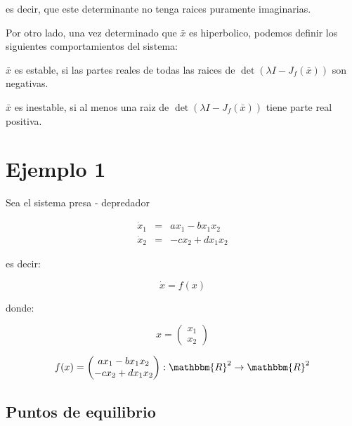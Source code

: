        es decir, que este determinante no tenga raices puramente imaginarias.

        Por otro lado, una vez determinado que $\bar{x}$ es hiperbolico, podemos definir los siguientes comportamientos del sistema:

        $\bar{x}$ es estable, si las partes reales de todas las raices de $\det{(\lambda I - J_f(\bar{x}))}$ son negativas.

        $\bar{x}$ es inestable, si al menos una raiz de $\det{(\lambda I - J_f(\bar{x}))}$ tiene parte real positiva.

    \section{Ejemplo 1}

        Sea el sistema presa - depredador

        \begin{eqnarray*}
            \dot{x}_1 & = & a x_1 - b x_1 x_2 \\
            \dot{x}_2 & = & -c x_2 + d x_1 x_2
        \end{eqnarray*}

        es decir:

        \begin{equation*}
            \dot{x} = f(x)
        \end{equation*}

        donde:

        \begin{equation}
            x =
            \begin{pmatrix}
                x_1 \\
                x_2
            \end{pmatrix}
        \end{equation}

        \begin{equation} \label{eq:predep}
            f(x) =
            \begin{pmatrix}
                a x_1 - b x_1 x_2 \\
                -c x_2 + d x_1 x_2
            \end{pmatrix} : \mathbbm{R}^2 \to \mathbbm{R}^2 
        \end{equation}

        \subsection{Puntos de equilibrio}

